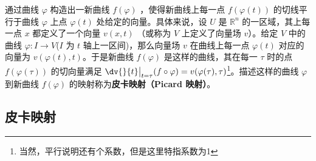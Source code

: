 
\begin{issues}
\issueDraft
\end{issues}

通过曲线 $\varphi$ 构造出一新曲线 $f(\varphi)$ ，使得新曲线上每一点 $f(\varphi(t))$ 的切线平行于曲线 $\varphi$ 上点 $\varphi(t)$ 处给定的向量。具体来说，设 $U$ 是 $\mathbb R^n$ 的一区域，其上每一点 $x$ 都定义了一个向量 $v(x,t)$ （或称为 $V$ 上定义了向量场 $v$）。给定 $V$ 中的曲线 $\varphi:I\rightarrow V$($I$ 为 $t$ 轴上一区间)，那么向量场 $v$ 在曲线上每一点 $\varphi(t)$ 对应的向量为 $v(\varphi(t),t)$。于是新曲线 $f(\varphi)$ 是这样的曲线，其在每一 $\tau$ 时的点 $f(\varphi(\tau))$ 的切向量满足 $\dv{}{t}\big|_{t=\tau}(f\circ \varphi)=v(\varphi(\tau),\tau)$\footnote{当然，平行说明还有个系数，但是这里特指系数为1}。描述这样的曲线 $\varphi$ 到新曲线 $f(\varphi)$ 的映射称为\textbf{皮卡映射（Picard 映射）}。
\subsection{皮卡映射}